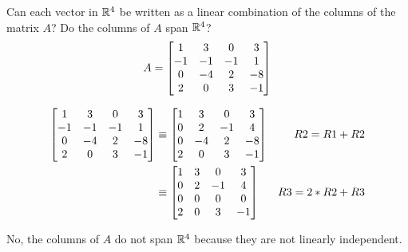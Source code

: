 \documentclass{../mathhomework}
\newenvironment{Mat}{\begin{bmatrix}}{\end{bmatrix}}
\begin{document}
\begin{problem}[1.4\#19]
    Can each vector in $\mathbb{R}^4$ be written as a linear combination of the columns of the matrix $A$? Do the columns of $A$ span $\mathbb{R}^4$?
    \begin{equation*}
        A = \begin{Mat}
            1 & 3 & 0 & 3 \\
            -1 & -1 & -1 & 1 \\
            0 & -4 & 2 & -8 \\
            2 & 0 & 3 & -1
        \end{Mat}
    \end{equation*}

    \begin{solution}
        \begin{align*}
            \begin{Mat}
                1 & 3 & 0 & 3 \\
                -1 & -1 & -1 & 1 \\
                0 & -4 & 2 & -8 \\
                2 & 0 & 3 & -1
            \end{Mat} & \equiv
            \begin{Mat}
                1 & 3 & 0 & 3 \\
                0 & 2 & -1 & 4 \\
                0 & -4 & 2 & -8 \\
                2 & 0 & 3 & -1
            \end{Mat} & R2 = R1 + R2 \\ & \equiv
            \begin{Mat}
                1 & 3 & 0 & 3 \\
                0 & 2 & -1 & 4 \\
                0 & 0 & 0 & 0 \\
                2 & 0 & 3 & -1
            \end{Mat} & R3 = 2 * R2 + R3
        \end{align*}

        No, the columns of $A$ do not span $\mathbb{R}^4$ because they are not linearly independent.
    \end{solution}
\end{problem}
\end{document}
